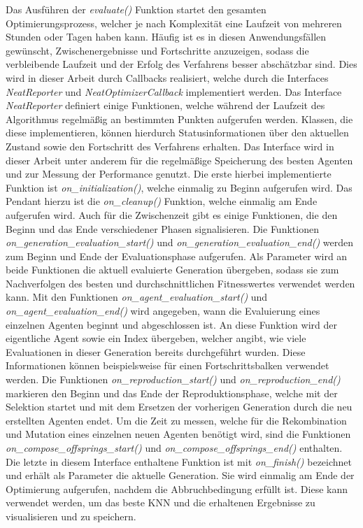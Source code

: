 Das Ausführen der \emph{evaluate()} Funktion startet den gesamten Optimierungsprozess, welcher je nach Komplexität eine Laufzeit von mehreren Stunden oder Tagen haben kann. Häufig ist es in diesen Anwendungsfällen gewünscht, Zwischenergebnisse und Fortschritte anzuzeigen, sodass die verbleibende Laufzeit und der Erfolg des Verfahrens besser abschätzbar sind. Dies wird in dieser Arbeit durch Callbacks realisiert, welche durch die Interfaces \emph{NeatReporter} und \emph{NeatOptimizerCallback} implementiert werden. Das Interface \emph{NeatReporter} definiert einige Funktionen, welche während der Laufzeit des Algorithmus regelmäßig an bestimmten Punkten aufgerufen werden. Klassen, die diese implementieren, können hierdurch Statusinformationen über den aktuellen Zustand sowie den Fortschritt des Verfahrens erhalten. Das Interface wird in dieser Arbeit unter anderem für die regelmäßige Speicherung des besten Agenten und zur Messung der Performance genutzt. Die erste hierbei implementierte Funktion ist \emph{on\_initialization()}, welche einmalig zu Beginn aufgerufen wird. Das Pendant hierzu ist die \emph{on\_cleanup()} Funktion, welche einmalig am Ende aufgerufen wird. Auch für die Zwischenzeit gibt es einige Funktionen, die den Beginn und das Ende verschiedener Phasen signalisieren. Die Funktionen \emph{on\_generation\_evaluation\_start()} und \emph{on\_generation\_evaluation\_end()} werden zum Beginn und Ende der Evaluationsphase aufgerufen. Als Parameter wird an beide Funktionen die aktuell evaluierte Generation übergeben, sodass sie zum Nachverfolgen des besten und durchschnittlichen Fitnesswertes verwendet werden kann. Mit den Funktionen \emph{on\_agent\_evaluation\_start()} und \emph{on\_agent\_evaluation\_end()} wird angegeben, wann die Evaluierung eines einzelnen Agenten beginnt und abgeschlossen ist. An diese Funktion wird der eigentliche Agent sowie ein Index übergeben, welcher angibt, wie viele Evaluationen in dieser Generation bereits durchgeführt wurden. Diese Informationen können beispielsweise für einen Fortschrittsbalken verwendet werden. Die Funktionen \emph{on\_reproduction\_start()} und \emph{on\_reproduction\_end()} markieren den Beginn und das Ende der Reproduktionsphase, welche mit der Selektion startet und mit dem Ersetzen der vorherigen Generation durch die neu erstellten Agenten endet. Um die Zeit zu messen, welche für die Rekombination und Mutation eines einzelnen neuen Agenten benötigt wird, sind die Funktionen \emph{on\_compose\_offsprings\_start()} und  \emph{on\_compose\_offsprings\_end()} enthalten. Die letzte in diesem Interface enthaltene Funktion ist mit \emph{on\_finish()} bezeichnet und erhält als Parameter die aktuelle Generation. Sie wird einmalig am Ende der Optimierung aufgerufen, nachdem die Abbruchbedingung erfüllt ist. Diese kann verwendet werden, um das beste \ac{KNN} und die erhaltenen Ergebnisse zu visualisieren und zu speichern.
